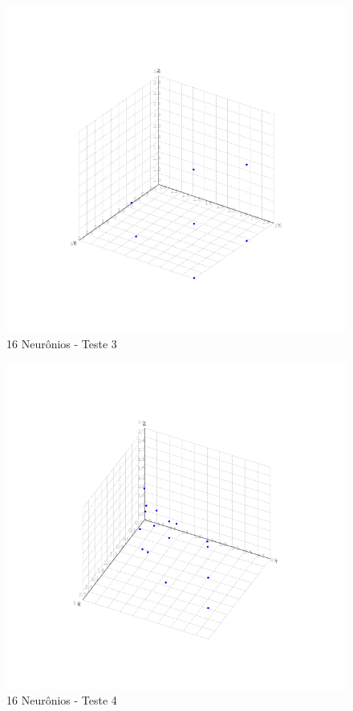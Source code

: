 \begin{figure}[ht!]
	\centering
	\includegraphics[scale=0.4]{./imgs/fig:out_16_teste_3}
	\caption{16 Neurônios - Teste 3}
	\label{fig:out_16_teste_3}
\end{figure}

\begin{figure}[ht!]
	\centering
	\includegraphics[scale=0.4]{./imgs/fig:out_16_teste_4}
	\caption{16 Neurônios - Teste 4}
	\label{fig:out_16_teste_4}
\end{figure}

